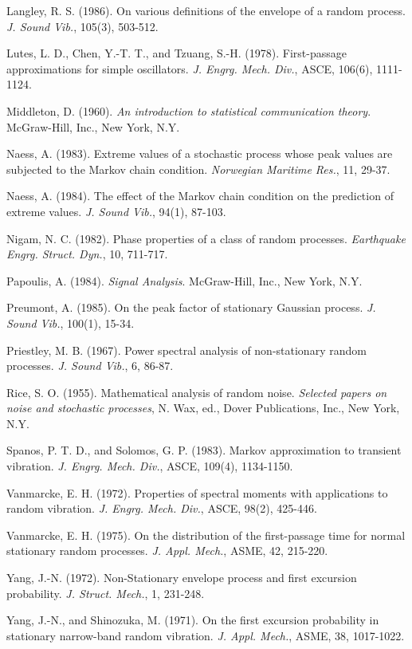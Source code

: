 \documentclass[11pt]{article}
\begin{document}
\begin{thebibliography}{99}
 Langley, R. S. (1986). On various definitions of the envelope of a random process. \textit{J. Sound Vib.}, 105(3), 503-512.

 Lutes, L. D., Chen, Y.-T. T., and Tzuang, S.-H. (1978). First-passage approximations for simple oscillators. \textit{J. Engrg. Mech. Div.}, ASCE, 106(6), 1111-1124.

 Middleton, D. (1960). \textit{An introduction to statistical communication theory}. McGraw-Hill, Inc., New York, N.Y.

 Naess, A. (1983). Extreme values of a stochastic process whose peak values are subjected to the Markov chain condition. \textit{Norwegian Maritime Res.}, 11, 29-37.

 Naess, A. (1984). The effect of the Markov chain condition on the prediction of extreme values. \textit{J. Sound Vib.}, 94(1), 87-103.

 Nigam, N. C. (1982). Phase properties of a class of random processes. \textit{Earthquake Engrg. Struct. Dyn.}, 10, 711-717.

 Papoulis, A. (1984). \textit{Signal Analysis}. McGraw-Hill, Inc., New York, N.Y.

 Preumont, A. (1985). On the peak factor of stationary Gaussian process. \textit{J. Sound Vib.}, 100(1), 15-34.

 Priestley, M. B. (1967). Power spectral analysis of non-stationary random processes. \textit{J. Sound Vib.}, 6, 86-87.

 Rice, S. O. (1955). Mathematical analysis of random noise. \textit{Selected papers on noise and stochastic processes}, N. Wax, ed., Dover Publications, Inc., New York, N.Y.

 Spanos, P. T. D., and Solomos, G. P. (1983). Markov approximation to transient vibration. \textit{J. Engrg. Mech. Div.}, ASCE, 109(4), 1134-1150.

 Vanmarcke, E. H. (1972). Properties of spectral moments with applications to random vibration. \textit{J. Engrg. Mech. Div.}, ASCE, 98(2), 425-446.

 Vanmarcke, E. H. (1975). On the distribution of the first-passage time for normal stationary random processes. \textit{J. Appl. Mech.}, ASME, 42, 215-220.

 Yang, J.-N. (1972). Non-Stationary envelope process and first excursion probability. \textit{J. Struct. Mech.}, 1, 231-248.

 Yang, J.-N., and Shinozuka, M. (1971). On the first excursion probability in stationary narrow-band random vibration. \textit{J. Appl. Mech.}, ASME, 38, 1017-1022.

\end{thebibliography}
\end{document}
